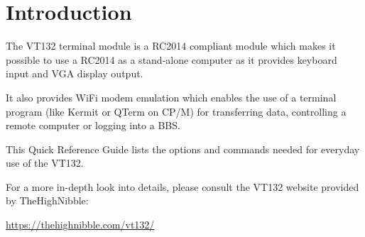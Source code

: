 \chapter{Introduction}

The VT132 terminal module is a RC2014 compliant module which makes it possible to use a RC2014 as a stand-alone computer
as it provides keyboard input and VGA display output.

It also provides WiFi modem emulation which enables the use of a terminal program (like Kermit or QTerm on CP/M) for
transferring data, controlling a remote computer or logging into a BBS.

This Quick Reference Guide lists the options and commands needed for everyday use of the VT132.

For a more in-depth look into details, please consult the VT132 website provided by TheHighNibble:

\url{https://thehighnibble.com/vt132/}

